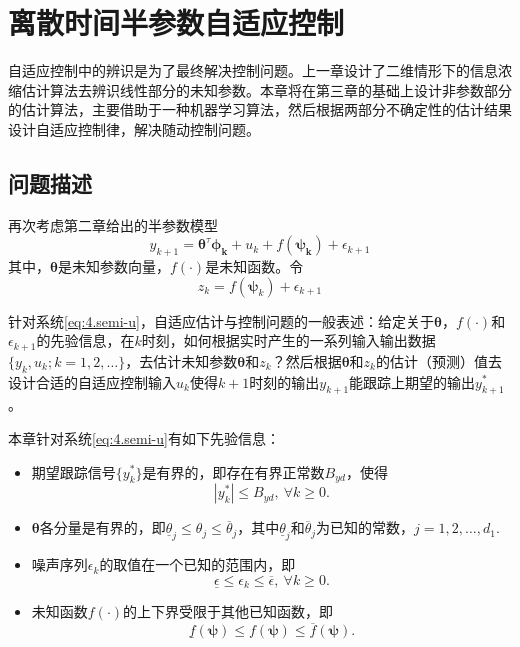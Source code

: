 \chapter{离散时间半参数自适应控制}\label{chap:4}
自适应控制中的辨识是为了最终解决控制问题。上一章设计了二维情形下的信息浓缩估计算法去辨识线性部分的未知参数。本章将在第三章的基础上设计非参数部分的估计算法，主要借助于一种机器学习算法，然后根据两部分不确定性的估计结果设计自适应控制律，解决随动控制问题。

\section{问题描述}\label{sect:4.1}
再次考虑第二章给出的半参数模型
\begin{equation}%
\label{eq:4.semi-u}
y_{k+1} = \bm{\theta}^{\tau}\bm{\phi_{k}}+u_{k}+f(\bm{\bm{\psi}_{k}})+\epsilon_{k+1}
\end{equation}
其中，$\bm{\theta}$是未知参数向量，$f(\cdot)$是未知函数。令
\begin{equation}
z_{k} = f(\bm{\psi}_{k}) + \epsilon_{k+1}
\end{equation}

针对系统\eqref{eq:4.semi-u}，自适应估计与控制问题的一般表述：给定关于$\bm{\theta}$，$f(\cdot)$和$\epsilon_{k+1}$的先验信息，在$k$时刻，如何根据实时产生的一系列输入输出数据$\{y_{k},u_{k};k=1,2,\ldots\}$，去估计未知参数$\bm{\theta}$和$z_{k}$？然后根据$\bm{\theta}$和$z_{k}$的估计（预测）值去设计合适的自适应控制输入$u_{k}$使得$k+1$时刻的输出$y_{k+1}$能跟踪上期望的输出$y_{k+1}^{*}$。

本章针对系统\eqref{eq:4.semi-u}有如下先验信息：
\begin{itemize}
\item 期望跟踪信号$\{y_{k}^{*}\}$是有界的，即存在有界正常数$B_{yd}$，使得
\begin{equation}\label{eq:4.ydB}
|y_{k}^{*}|\leq B_{yd},\ \forall k\geq0.
\end{equation}
\item $\bm{\theta}$各分量是有界的，即$\underline{\theta}_{j}\leq\theta_{j}\leq\overline{\theta}_{j}$，其中$\underline{\theta}_{j}$和$\overline{\theta}_{j}$为已知的常数，$j=1,2,\ldots,d_{1}$.
\item 噪声序列$\epsilon_{k}$的取值在一个已知的范围内，即
\begin{equation}\label{eq:4.wB}
\underline{\epsilon}\leq\epsilon_{k}\leq\overline{\epsilon},\ \forall k\geq0.
\end{equation}
\item 未知函数$f(\cdot)$的上下界受限于其他已知函数，即
\begin{equation}\label{eq:4.fB}
\underline{f}(\bm{\psi})\leq f(\bm{\psi})\leq \overline{f}(\bm{\psi}).
\end{equation}
\end{itemize}

